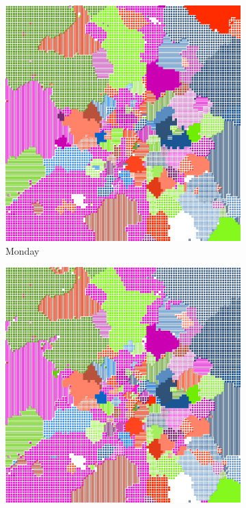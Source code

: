 \documentclass[12pt,a4paper]{article}
\begin{document}
\begin{figure}[H]
\centering
\begin{subfigure}[b]{0.30\textwidth}
\includegraphics[width=\textwidth]{weekDef/1Mon.png}
\caption{Monday}
\end{subfigure}
\begin{subfigure}[b]{0.30\textwidth}
\includegraphics[width=\textwidth]{weekDef/2Tue.png}

\end{subfigure}
\end{figure}
\end{document}
